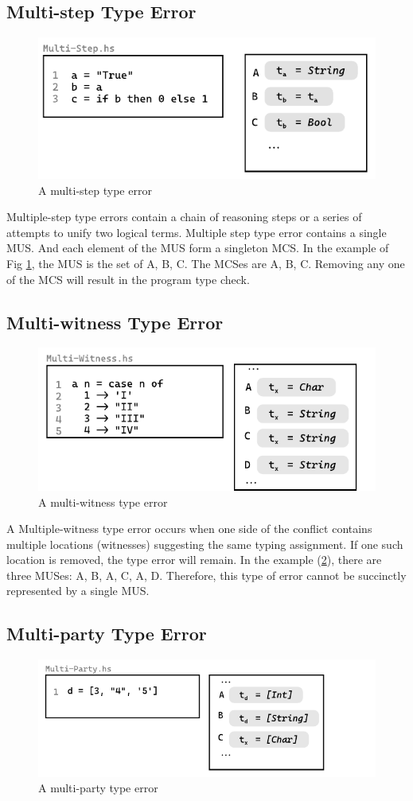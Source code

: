 \subsection{Multi-step Type Error}
\begin{figure}[hbt]

  \includegraphics[width=0.5\linewidth]{Multi-Step-2}
  \caption{
    \label{fig:multi-step-2}
    A multi-step type error
  }
\end{figure}
Multiple-step type errors contain a chain of reasoning steps or a series of attempts to unify two logical terms. Multiple step type error contains a single MUS. And each element of the MUS form a singleton MCS. In the example of Fig \ref{fig:multi-step-2}, the MUS is the set of {A, B, C}. The MCSes are {A}, {B}, {C}. Removing any one of the MCS will result in the program type check.

\subsection{Multi-witness Type Error}
\begin{figure}[hbt]
  \includegraphics[width=0.5\linewidth]{Multi-Witness-2}
  \caption{
    \label{fig:multi-witness-2}
    A multi-witness type error
  }
\end{figure}

A Multiple-witness type error occurs when one side of the conflict contains multiple locations (witnesses) suggesting the same typing assignment. If one such location is removed, the type error will remain. In the example (\ref{fig:multi-witness-2}), there are three MUSes: {A, B}, {A, C}, {A, D}. Therefore, this type of error cannot be succinctly represented by a single MUS. 

\subsection{Multi-party Type Error}
\begin{figure}[hbt]
  \includegraphics[width=0.5\linewidth]{Multi-Party-2}
  \caption{
    \label{fig:multi-party-2}
    A multi-party type error
  }
\end{figure}

